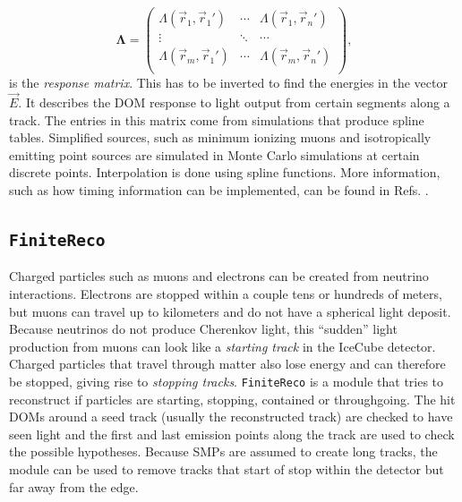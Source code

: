 \begin{equation}
\mathbf{\Lambda} = 
\begin{pmatrix}
\Lambda(\vec{r}_1,\vec{r}_1') & \cdots & \Lambda(\vec{r}_1,\vec{r}_n')\\
\vdots  & \ddots & \cdots \\
\Lambda(\vec{r}_m,\vec{r}_1') & \cdots & \Lambda(\vec{r}_m,\vec{r}_n')\\
\end{pmatrix},
\end{equation}
\noindent is the \textit{response matrix}. This has to be inverted to find the energies in the vector $\vec{E}$. It describes the DOM response to light output from certain segments along a track. The entries in this matrix come from simulations that produce spline tables. Simplified sources, such as minimum ionizing muons and isotropically emitting point sources are simulated in Monte Carlo simulations at certain discrete points. Interpolation is done using spline functions. More information, such as how timing information can be implemented, can be found in Refs. \cite{millipedeinternal,stefthesis}.


\subsection{\texttt{FiniteReco}}
\label{subsec:finitereco}
Charged particles such as muons and electrons can be created from neutrino interactions. Electrons are stopped within a couple tens or hundreds of meters, but muons can travel up to kilometers and do not have a spherical light deposit. Because neutrinos do not produce Cherenkov light, this ``sudden'' light production from muons can look like a \textit{starting track} in the IceCube detector. Charged particles that travel through matter also lose energy and can therefore be stopped, giving rise to \textit{stopping tracks}. \texttt{FiniteReco} is a module that tries to reconstruct if particles are starting, stopping, contained or throughgoing. The hit DOMs around a seed track (usually the reconstructed track) are checked to have seen light and the first and last emission points along the track are used to check the possible hypotheses. Because SMPs are assumed to create long tracks, the module can be used to remove tracks that start of stop within the detector but far away from the edge. 

